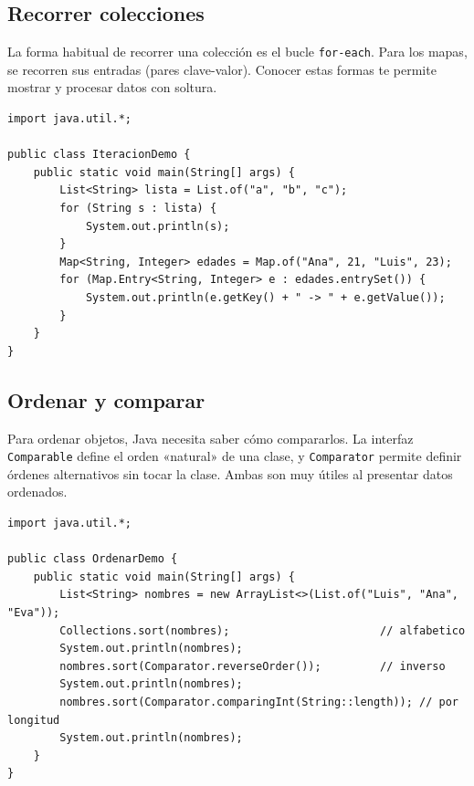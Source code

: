 \documentclass[11pt]{article}
\begin{document}
\subsection{Recorrer colecciones}
La forma habitual de recorrer una colección es el bucle \texttt{for-each}. Para los mapas, se recorren sus entradas (pares clave-valor). Conocer estas formas te permite mostrar y procesar datos con soltura.

\begin{cajacodigo}
\begin{lstlisting}[style=java]
import java.util.*;

public class IteracionDemo {
    public static void main(String[] args) {
        List<String> lista = List.of("a", "b", "c");
        for (String s : lista) {
            System.out.println(s);
        }
        Map<String, Integer> edades = Map.of("Ana", 21, "Luis", 23);
        for (Map.Entry<String, Integer> e : edades.entrySet()) {
            System.out.println(e.getKey() + " -> " + e.getValue());
        }
    }
}
\end{lstlisting}
\end{cajacodigo}
\vspace{2pt}
\subsection{Ordenar y comparar}
Para ordenar objetos, Java necesita saber cómo compararlos. La interfaz \texttt{Comparable} define el orden «natural» de una clase, y \texttt{Comparator} permite definir órdenes alternativos sin tocar la clase. Ambas son muy útiles al presentar datos ordenados.

\begin{cajacodigo}
\begin{lstlisting}[style=java]
import java.util.*;

public class OrdenarDemo {
    public static void main(String[] args) {
        List<String> nombres = new ArrayList<>(List.of("Luis", "Ana", "Eva"));
        Collections.sort(nombres);                       // alfabetico
        System.out.println(nombres);
        nombres.sort(Comparator.reverseOrder());         // inverso
        System.out.println(nombres);
        nombres.sort(Comparator.comparingInt(String::length)); // por longitud
        System.out.println(nombres);
    }
}
\end{lstlisting}
\end{cajacodigo}
\vspace{2pt}
\end{document}
